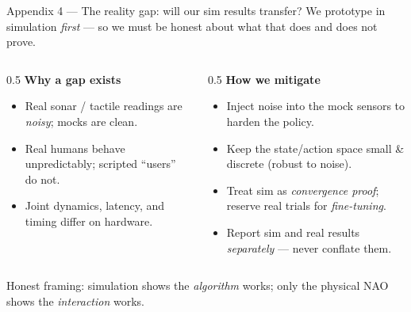 \documentclass[aspectratio=169,10pt]{beamer}
\begin{document}
\begin{frame}{Appendix 4 --- The reality gap: will our sim results transfer?}
  \footnotesize
  We prototype in simulation \emph{first} --- so we must be honest about what that does and does not prove.
  \begin{columns}[T]
    \begin{column}{0.5\textwidth}
      \textbf{Why a gap exists}
      \begin{itemize}
        \item Real sonar / tactile readings are \emph{noisy}; mocks are clean.
        \item Real humans behave unpredictably; scripted ``users'' do not.
        \item Joint dynamics, latency, and timing differ on hardware.
      \end{itemize}
    \end{column}
    \begin{column}{0.5\textwidth}
      \textbf{How we mitigate}
      \begin{itemize}
        \item Inject noise into the mock sensors to harden the policy.
        \item Keep the state/action space small \& discrete (robust to noise).
        \item Treat sim as \emph{convergence proof}; reserve real trials for \emph{fine-tuning}.
        \item Report sim and real results \emph{separately} --- never conflate them.
      \end{itemize}
    \end{column}
  \end{columns}
  \vspace{0.4em}
  \begin{block}{}
    Honest framing: simulation shows the \emph{algorithm} works; only the physical NAO shows the \emph{interaction} works.
  \end{block}
\end{frame}
\end{document}
